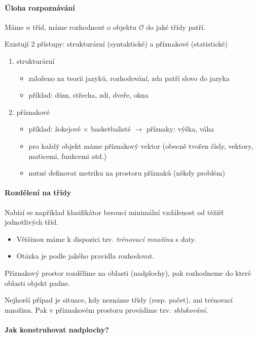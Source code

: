 \paragraph{Úloha rozpoznávání}
Máme $n$ tříd, máme rozhodnout o objektu $\mathcal{O}$ do jaké třídy patří.

Existují 2 přístupy: strukturární (syntaktické) a příznakové (statistické)
\begin{enumerate}
	\item strukturární
	\begin{itemize}
		\item založeno na teorii jazyků, rozhodování, zda patří slovo do jazyka
		\item příklad: dům, střecha, zdi, dveře, okna
	\end{itemize}
	\item příznakové
	\begin{itemize}
		\item příklad: žokejové $\times$ basketbalisté $\rightarrow$ příznaky: výška, váha
		\item pro každý objekt máme příznakový vektor (obecně tvořen čísly, vektory, maticemi, funkcemi atd.)
		\item nutné definovat metriku na prostoru příznaků (někdy problém)
	\end{itemize}
\end{enumerate}

\paragraph{Rozdělení na třídy}

Nabízí se například klasifikátor beroucí minimální vzdálenost od těžišť jednotlivých tříd.

\begin{itemize}
	\item Většinou máme k dispozici tzv. \emph{trénovací množinu} s daty.
	\item Otázka je podle jakého pravidla rozhodovat.
\end{itemize}
Příznakový prostor rozdělíme na oblasti (nadplochy), pak rozhodneme do které oblasti objekt padne.

Nejhorší případ je situace, kdy neznáme třídy (resp. počet), ani trénovací množinu. Pak v příznakovém prostoru
provádíme tzv. \emph{shlukování}.

\paragraph{Jak konstruhovat nadplochy?}

